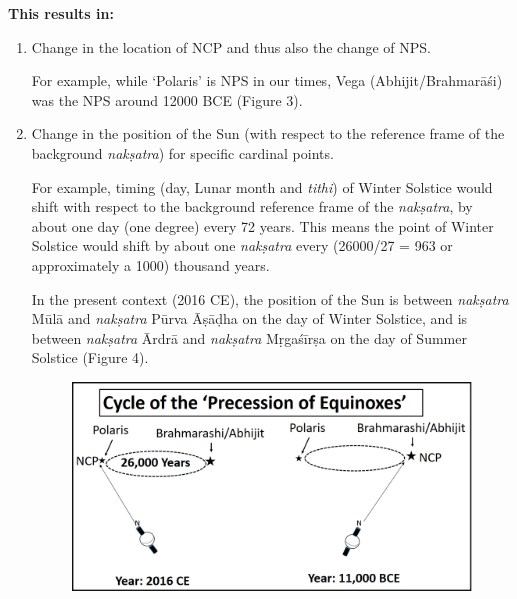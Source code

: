 \textbf{This results in:}

\begin{enumerate}
\itemsep=0pt
\item 
 Change in the location of NCP and thus also the change of NPS.

 For example, while ‘Polaris’ is NPS in our times, Vega (Abhijit/Brahmarāśi) was the NPS around 12000 BCE (Figure 3).

 \item Change in the position of the Sun (with respect to the reference frame of the background \textit{nakṣatra}) for specific cardinal points.

 For example, timing (day, Lunar month and \textit{tithi}) of Winter Solstice would shift with respect to the background reference frame of the \textit{nakṣatra}, by about one day (one degree) every 72 years. This means the point of Winter Solstice would shift by about one \textit{nakṣatra} every (26000/27 = 963 or approximately a 1000) thousand years.

 In the present context (2016 CE), the position of the Sun is between \textit{nakṣatra} Mūlā and \textit{nakṣatra} Pūrva Āṣāḍha on the day of Winter Solstice, and is between \textit{nakṣatra} Ārdrā and \textit{nakṣatra} Mṛgaśīrṣa on the day of Summer Solstice (Figure 4).


\begin{figure}[!h]
\includegraphics[scale=.17]{images/chap2-4.jpg}
\caption{}\label{chap1-fig3}
\end{figure}



\end{enumerate}
